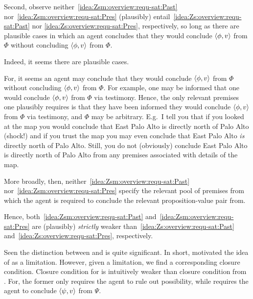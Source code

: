 \begin{note}
  Second, observe neither~\ref{idea:Zsm:overview:requ-sat:Past} nor~\ref{idea:Zsm:overview:requ-sat:Pres} (plausibly) entail~\ref{idea:Zs:overview:requ-sat:Past} nor \ref{idea:Zs:overview:requ-sat:Pres}, respectively, so long as there are plausible cases in which an agent concludes that they would conclude \(\langle \phi, v \rangle\) from \(\Phi\) without concluding \(\langle \phi, v \rangle\) from \(\Phi\).

  Indeed, it seems there are plausible cases.

  For, it seems an agent may conclude that they would conclude \(\langle \phi, v \rangle\) from \(\Phi\) without concluding \(\langle \phi, v \rangle\) from \(\Phi\).
  For example, one may be informed that one would conclude \(\langle \phi, v \rangle\) from \(\Phi\) via testimony.
  Hence, the only relevant premises one plausibly requires is that they have been informed they would conclude \(\langle \phi, v \rangle\) from \(\Phi\) via testimony, and \(\Phi\) may be arbitrary.
  E.g.\ I tell you that if you looked at the map you would conclude that East Palo Alto is directly north of Palo Alto (shock!) and if you trust the map you may even conclude that East Palo Alto \emph{is} directly north of Palo Alto.
  Still, you do not (obviously) conclude East Palo Alto is directly north of Palo Alto from any premises associated with details of the map.
\end{note}

\begin{note}
  More broadly, then, neither~\ref{idea:Zsm:overview:requ-sat:Past} nor~\ref{idea:Zsm:overview:requ-sat:Pres} specify the relevant pool of premises from which the agent is required to conclude the relevant proposition-value pair from.

  Hence, both~\ref{idea:Zsm:overview:requ-sat:Past} and~\ref{idea:Zsm:overview:requ-sat:Pres} are (plausibly) \emph{strictly} weaker than~\ref{idea:Zs:overview:requ-sat:Past} and~\ref{idea:Zs:overview:requ-sat:Pres}, respectively.
\end{note}

\begin{note}
  Seen the distinction between \iCS{} and \iCSp{} is quite significant.
  In short, motivated the idea of \csN{} as a limitation.
  However, given a limitation, we find a corresponding closure condition.
  Closure condition for \iCSm{} is intuitively weaker than closure condition from \iCS{}.
  For, the former only requires the agent to rule out possibility, while \iCS{} requires the agent to conclude \(\langle \psi, v \rangle\) from \(\Psi\).
\end{note}

